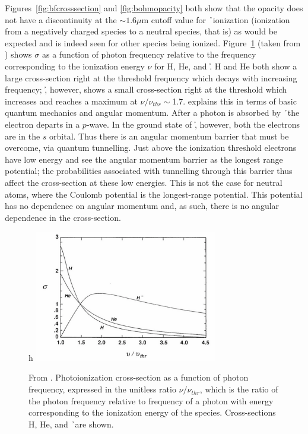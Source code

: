 Figures~\ref{fig:bfcrosssection} and \ref{fig:bohmopacity} both show
that the opacity does not have a discontinuity at the $\sim 1.6\mu$m
cutoff value for \h\ ionization (ionization from a negatively
charged species to a neutral species, that is) as would be expected and is indeed
seen for other species being ionized.  Figure~\ref{fig:bethe} (taken
from \citealt{bethe1977}) shows $\sigma$ as a function of photon
frequency relative to the frequency corresponding to the ionization
energy $\nu$ for H, He, and \h.  H and He both show a large
cross-section right at the threshold frequency which decays with
increasing frequency; \h, however, shows a small cross-section right
at the threshold which increases and reaches a maximum at
$\nu/\nu_{thr}\sim$1.7.  \cite{rau1996} explains this in terms of basic
quantum mechanics and angular momentum.  After a photon is absorbed by
\h\ the electron departs in a $p$-wave.  In the ground state of \h,
however, both the electrons are in the $s$ orbital.  Thus there is an
angular momentum barrier that must be overcome, via quantum
tunnelling.  Just above the ionization threshold electrons have low
energy and see the angular momentum barrier as the longest range
potential; the probabilities associated with tunnelling through this
barrier thus affect the cross-section at these low energies.  This is not the case for neutral atoms, where the Coulomb
potential is the longest-range potential.  This potential has no dependence on angular momentum and, as such, there is no angular dependence in the cross-section.
\begin{figure}{h}
\includegraphics[width=80mm]{figs/betheplot.png}
\caption{\label{fig:bethe} From \citealt{bethe1977}. Photoionization
  cross-section as a function of photon frequency, expressed in the
  unitless ratio $\nu/\nu_{thr}$, which is the ratio of the photon
  frequency relative to frequency of a photon with energy
  corresponding to the ionization energy of the species.
  Cross-sections H, He, and \h\ are shown.}
\end{figure}

